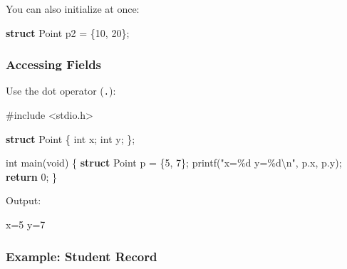 \documentclass[
  letterpaper,
  DIV=11,
  numbers=noendperiod]{scrreprt}
\newenvironment{Shaded}{\begin{snugshade}}{\end{snugshade}}
\newcommand{\ControlFlowTok}[1]{\textcolor[rgb]{0.00,0.23,0.31}{\textbf{#1}}}
\newcommand{\DataTypeTok}[1]{\textcolor[rgb]{0.68,0.00,0.00}{#1}}
\newcommand{\DecValTok}[1]{\textcolor[rgb]{0.68,0.00,0.00}{#1}}
\newcommand{\ImportTok}[1]{\textcolor[rgb]{0.00,0.46,0.62}{#1}}
\newcommand{\KeywordTok}[1]{\textcolor[rgb]{0.00,0.23,0.31}{\textbf{#1}}}
\newcommand{\NormalTok}[1]{\textcolor[rgb]{0.00,0.23,0.31}{#1}}
\newcommand{\OperatorTok}[1]{\textcolor[rgb]{0.37,0.37,0.37}{#1}}
\newcommand{\PreprocessorTok}[1]{\textcolor[rgb]{0.68,0.00,0.00}{#1}}
\newcommand{\SpecialCharTok}[1]{\textcolor[rgb]{0.37,0.37,0.37}{#1}}
\newcommand{\StringTok}[1]{\textcolor[rgb]{0.13,0.47,0.30}{#1}}
\newcommand{\VariableTok}[1]{\textcolor[rgb]{0.07,0.07,0.07}{#1}}
\begin{document}
You can also initialize at once:

\begin{Shaded}
\begin{Highlighting}[]
\KeywordTok{struct}\NormalTok{ Point p2 }\OperatorTok{=} \OperatorTok{\{}\DecValTok{10}\OperatorTok{,} \DecValTok{20}\OperatorTok{\};}
\end{Highlighting}
\end{Shaded}

\subsubsection{Accessing Fields}\label{accessing-fields}

Use the dot operator (\texttt{.}):

\begin{Shaded}
\begin{Highlighting}[]
\PreprocessorTok{\#include }\ImportTok{\textless{}stdio.h\textgreater{}}

\KeywordTok{struct}\NormalTok{ Point }\OperatorTok{\{}
    \DataTypeTok{int}\NormalTok{ x}\OperatorTok{;}
    \DataTypeTok{int}\NormalTok{ y}\OperatorTok{;}
\OperatorTok{\};}

\DataTypeTok{int}\NormalTok{ main}\OperatorTok{(}\DataTypeTok{void}\OperatorTok{)} \OperatorTok{\{}
    \KeywordTok{struct}\NormalTok{ Point p }\OperatorTok{=} \OperatorTok{\{}\DecValTok{5}\OperatorTok{,} \DecValTok{7}\OperatorTok{\};}
\NormalTok{    printf}\OperatorTok{(}\StringTok{"x=}\SpecialCharTok{\%d}\StringTok{ y=}\SpecialCharTok{\%d\textbackslash{}n}\StringTok{"}\OperatorTok{,}\NormalTok{ p}\OperatorTok{.}\NormalTok{x}\OperatorTok{,}\NormalTok{ p}\OperatorTok{.}\NormalTok{y}\OperatorTok{);}
    \ControlFlowTok{return} \DecValTok{0}\OperatorTok{;}
\OperatorTok{\}}
\end{Highlighting}
\end{Shaded}

Output:

\begin{Shaded}
\begin{Highlighting}[]
\VariableTok{x}\OperatorTok{=}\NormalTok{5 }\VariableTok{y}\OperatorTok{=}\NormalTok{7}
\end{Highlighting}
\end{Shaded}

\subsubsection{Example: Student Record}\label{example-student-record}
\end{document}
